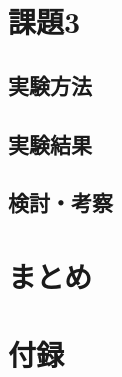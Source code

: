 \documentclass[12pt]{jarticle}
\begin{document}
\section{課題3}
\subsection{実験方法}
\subsection{実験結果}
\subsection{検討・考察}


\clearpage

\section{まとめ}



\begin{thebibliography}{99}

\end{thebibliography}

\clearpage
\appendix
\section{付録}




\end{document}
